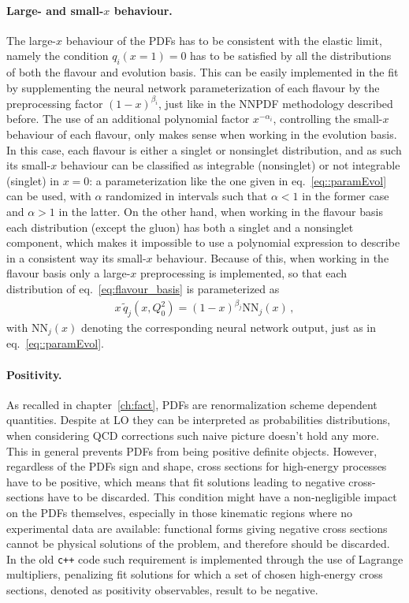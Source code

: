 \paragraph{Large- and small-$x$ behaviour.} 
The large-$x$ behaviour of the PDFs has to be consistent with the elastic limit, namely the condition
$q_i\left(x=1\right)=0$ has to be satisfied by all the distributions of both the flavour and evolution basis.
This can be easily implemented in the fit by supplementing the neural network parameterization of 
each flavour by the preprocessing factor $\left(1-x\right)^{\beta_i}$, just like in the NNPDF methodology
described before.
The use of an additional polynomial factor $x^{-\alpha_i}$, controlling the small-$x$ behaviour of each flavour,
only makes sense when working in the evolution basis. In this case, each flavour is either a singlet or nonsinglet
distribution, and as such its small-$x$ behaviour can be classified as integrable (nonsinglet) or not integrable (singlet)
in $x=0$: a parameterization like the one given in eq.~\eqref{eq::paramEvol} can be used, with $\alpha$
randomized in intervals such that $\alpha<1$ in the former case and $\alpha>1$ in the latter.
%
On the other hand, when working in the flavour basis each distribution (except the gluon) has both a singlet 
and a nonsinglet component, which makes it impossible to use a polynomial expression 
to describe in a consistent way its small-$x$ behaviour. Because of this, when working in the flavour basis
only a large-$x$ preprocessing is implemented, so that each distribution of eq.~\eqref{eq:flavour_basis} is
parameterized as
\begin{align}
    x\,\tilde{q}_j\left(x, Q_0^2\right) = \left(1-x\right)^{\beta_{j}}\text{NN}_{j}\left(x\right)\,,
\end{align}
with $\text{NN}_{j}\left(x\right)$ denoting the corresponding neural network output, just as in eq.~\eqref{eq::paramEvol}.



\paragraph{Positivity.}
As recalled in chapter~\ref{ch:fact}, PDFs are renormalization scheme dependent quantities.
Despite at LO they can be interpreted as probabilities distributions, when considering QCD corrections
such naive picture doesn't hold any more. This in general prevents PDFs from being positive definite objects.
However, regardless of the PDFs sign and shape, cross sections for high-energy processes have to be positive,
which means that fit solutions leading to negative cross-sections have to be discarded.
This condition might have a non-negligible impact on the PDFs themselves, 
especially in those kinematic regions where no experimental
data are available: functional forms giving negative cross sections cannot be 
physical solutions of the problem, and therefore should be discarded.  
In the old {\tt c++} code such requirement is implemented through the use of Lagrange multipliers, 
penalizing fit solutions for which a set of chosen high-energy cross sections,
denoted as positivity observables, result to be negative.

